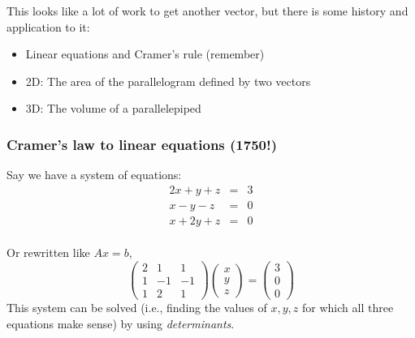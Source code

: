 \documentclass{beamer}
\begin{document}
\begin{frame}
This looks like a lot of work to get another vector, but there is some history and application to it:
\begin{itemize}
\item Linear equations and Cramer's rule (remember)
\item 2D: The area of the parallelogram defined by two vectors 
\item 3D: The volume of a parallelepiped
\end{itemize}

\end{frame}
\begin{frame}
\frametitle{Cramer's law to linear equations (1750!)}
Say we have a system of equations:
$$
\begin{array}{ccc}
2x + y + z &=& 3\\
x-y-z &=& 0\\
x + 2y + z &=& 0
\end{array}$$\\
Or rewritten like $A x = b$,
$$\left(\begin{array}{ccc}
2 & 1 & 1\\
1 & -1 & -1\\
1 & 2 & 1 \end{array} \right)
\left( \begin{array}{c}
x \\
y \\
z  \end{array} \right) = 
\left( \begin{array}{c}
3 \\
0 \\
0 \end{array} \right)$$
This system can be solved (i.e., finding the values of $x, y, z$ for which all three equations make sense) by using \emph{determinants}.
\end{frame}
\end{document}
